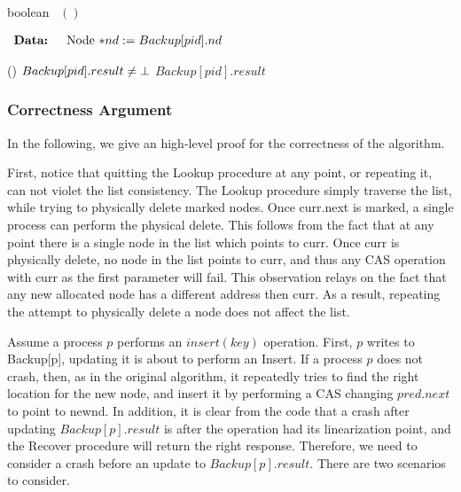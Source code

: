\begin{algorithm}[H]
	\footnotesize
	
	\caption{boolean \recover\ $()$}
	
	$ \begin{array}{rl}
	\mbox{\textbf{Data: }}	&	\mbox{Node $*nd := Backup[pid].nd$}
	\end{array} $
	
	\uIf () {$Backup[pid].result \neq \mbox{$\bot$}$}
		{\KwRet $Backup[pid].result$}
	
\end{algorithm}


\clearpage
\subsubsection*{Correctness Argument}
In the following, we give an high-level proof for the correctness of the algorithm.

First, notice that quitting the Lookup procedure at any point, or repeating it, can not violet the list consistency. The Lookup procedure simply traverse the list, while trying to physically delete marked nodes.
Once curr.next is marked, a single process can perform the physical delete. This follows from the fact that at any point there is a single node in the list which points to curr. Once curr is physically delete, no node in the list points to curr, and thus any CAS operation with curr as the first parameter will fail. This observation relays on the fact that any new allocated node has a different address then curr. As a result, repeating the attempt to physically delete a node does not affect the list.

Assume a process $p$ performs an $insert(key)$ operation. First, $p$ writes to Backup[p], updating it is about to perform an Insert. If a process $p$ does not crash, then, as in the original algorithm, it repeatedly tries to find the right location for the new node, and insert it by performing a CAS changing $pred.next$ to point to newnd. In addition, it is clear from the code that a crash after updating $Backup[p].result$ is after the operation had its linearization point, and the Recover procedure will return the right response. Therefore, we need to consider a crash before an update to $Backup[p].result$. There are two scenarios to consider.

